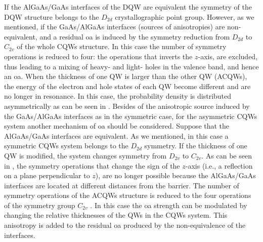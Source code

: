 If the AlGaAs/GaAs interfaces of the DQW are equivalent the symmetry of the DQW structure belongs to the $D_{2d}$ crystallographic point group. However, as we mentioned, if the GaAs/AlGaAs interfaces (sources of anisotropies) are non-equivalent, and a residual \gls{oa} is induced by the symmetry reduction from $D_{2d}$ to $C_{2v}$ of the whole \gls{CQWs} structure. In this case the number of symmetry operations is reduced to four: the operations that inverts the  $z$-axis, are excluded, thus leading to a mixing of heavy- and light- holes in the valence band, and hence an \gls{oa}.
When the thickness of one \gls{QW} is larger than the other \gls{QW} (\gls{ACQWs}), the energy of the electron and hole states of each \gls{QW} become different and are no longer in resonance. In this case, the probability density is distributed asymmetrically as can be seen in . 
Besides of the anisotropic source induced by the GaAs/AlGaAs interfaces as in the symmetric case, for the asymmetric \gls{CQWs}  system another mechanism of \gls{oa} should be considered. Suppose that the AlGaAs/GaAs interfaces are equivalent. As we mentioned, in this case a symmetric \gls{CQWs} system belongs to the $D_{2d}$ symmetry. If the thickness of one \gls{QW} is modified, the system changes symmetry from $D_{2v}$ to $C_{2v}$. As can be seen in , the symmetry operations that change the sign of the $z$-axis (i.e., a reflection on a plane perpendicular to $z$), are no longer possible because the AlGaAs/GaAs interfaces are located at different distances from the barrier.
The number of symmetry operations of the \gls{ACQWs} structure is reduced to the four operations of the symmetry group $C_{2v}$ \cite{ivchenko2008spinphoto,glazov2018electron}. In this case the \gls{oa} strength can be modulated by changing
the relative thicknesses of the \gls{QW}s in the \gls{CQWs} system. This anisotropy is added to the residual \gls{oa} produced by the non-equivalence of the interfaces.

